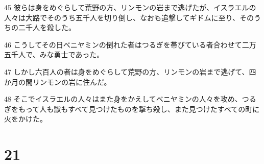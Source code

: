 \par 45 彼らは身をめぐらして荒野の方、リンモンの岩まで逃げたが、イスラエルの人々は大路でそのうち五千人を切り倒し、なおも追撃してギドムに至り、そのうちの二千人を殺した。
\par 46 こうしてその日ベニヤミンの倒れた者はつるぎを帯びている者合わせて二万五千人で、みな勇士であった。
\par 47 しかし六百人の者は身をめぐらして荒野の方、リンモンの岩まで逃げて、四か月の間リンモンの岩に住んだ。
\par 48 そこでイスラエルの人々はまた身をかえしてベニヤミンの人々を攻め、つるぎをもって人も獣もすべて見つけたものを撃ち殺し、また見つけたすべての町に火をかけた。

\chapter{21}

